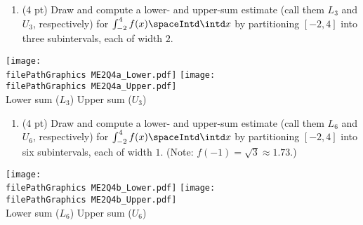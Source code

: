 \begin{enumerate}[label=(\alph*)]
\item\label{itm : ME2Q4a} (4 pt) Draw and compute a lower- and upper-sum estimate (call them $L_{3}$ and $U_{3}$, respectively) for $\int_{-2}^{4} f(x) \spaceIntd \intd x$ by partitioning $[-2,4]$ into three subintervals, each of width $2$.
\end{enumerate}
\begin{center}
\texttt{[image: \\filePathGraphics ME2Q4a\_Lower.pdf]}%
\hspace{0.5in}
\texttt{[image: \\filePathGraphics ME2Q4a\_Upper.pdf]}%
\\
Lower sum ($L_{3}$)
\hspace{1.75in}
Upper sum ($U_{3}$)
\end{center}




\newpage

\begin{enumerate}[resume,label=(\alph*)]
\item\label{itm : ME2Q4b} (4 pt) Draw and compute a lower- and upper-sum estimate (call them $L_{6}$ and $U_{6}$, respectively) for $\int_{-2}^{4} f(x) \spaceIntd \intd x$ by partitioning $[-2,4]$ into six subintervals, each of width $1$. (Note: $f(-1) = \sqrt{3} \approx 1.73$.)
\end{enumerate}
\begin{center}
\texttt{[image: \\filePathGraphics ME2Q4b\_Lower.pdf]}%
\hspace{0.5in}
\texttt{[image: \\filePathGraphics ME2Q4b\_Upper.pdf]}%
\\
Lower sum ($L_{6}$)
\hspace{1.75in}
Upper sum ($U_{6}$)
\end{center}

